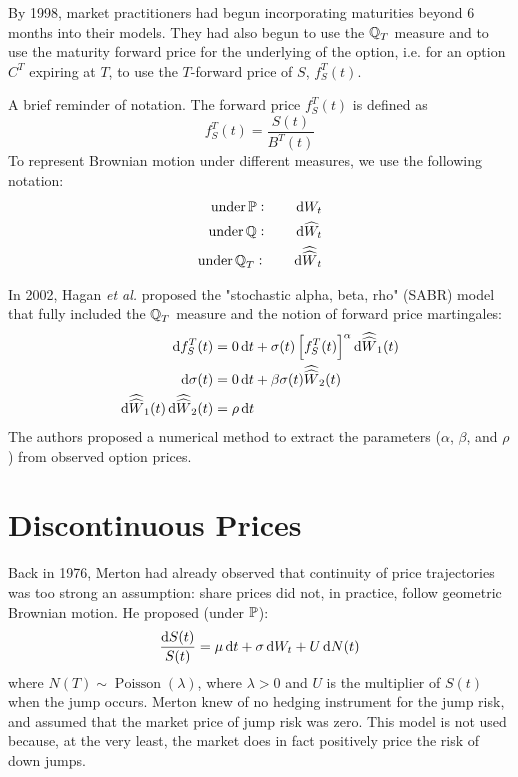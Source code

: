 \documentclass[11pt]{article}
\begin{document}
By 1998, market practitioners had begun incorporating maturities beyond 6 months into their models. They had also begun to use the $\operatorname{\mathbb Q}_T$ measure and to use the maturity forward price for the underlying of the option, i.e. for an option $C^T$ expiring at $T$, to use the $T$-forward price of $S$, $f^T_S(t)$.

\begin{remark}
A brief reminder of notation. The forward price $f^T_S(t)$ is defined as 
$$ f^T_S(t) = \frac{S(t)}{B^T(t)}$$
To represent Brownian motion under different measures, we use the following notation:
\begin{align*}
\text{under} \Pmeas: \qquad \dif W_t \\
\text{under} \Qmeas: \qquad \dif \widehat{W}_t \\
\text{under} \Qmeas_T: \qquad \dif \widehat{\widehat{W}}_t \\
\end{align*}
\end{remark}

In 2002, Hagan {\em et al.} proposed the "stochastic alpha, beta, rho" (SABR) model that fully included the $\operatorname{\mathbb Q}_T$ measure and the notion of forward price martingales:
\begin{align*}
\dif f^T_S(t) &= 0 \dif t + \sigma(t)\left[ f_S^T(t) \right]^\alpha \dif \widehat{\widehat{W}}_1(t) \\
\dif \sigma(t) &= 0 \dif t + \beta \sigma(t) \widehat{\widehat{W}}_2(t) \\
\dif \widehat{\widehat{W}}_1(t) \dif \widehat{\widehat{W}}_2(t) &= \rho \dif t \\
\end{align*}
The authors proposed a numerical method to extract the parameters ($\alpha$, $\beta$, and $\rho$) from observed option prices.

\section{Discontinuous Prices}

Back in 1976, Merton had already observed that continuity of price trajectories was too strong an assumption: share prices did not, in practice, follow geometric Brownian motion. He proposed (under $\operatorname{\mathbb P}$):
$$ \frac{\dif S(t)}{S(t)} = \mu \dif t + \sigma \dif W_t + U \dif N(t)$$
where $N(T) \sim \operatorname{Poisson}(\lambda)$, where $\lambda > 0$ and $U$ is the multiplier of $S(t)$ when the jump occurs. Merton knew of no hedging instrument for the jump risk, and assumed that the market price of jump risk was zero. This model is not used because, at the very least, the market does in fact positively price the risk of down jumps. \\
\end{document}
